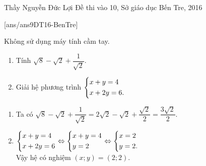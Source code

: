 \begin{name}
{Thầy  Nguyễn Đức Lợi}
{Đề thi vào 10, Sở giáo dục Bến Tre, 2016}
\end{name}
\setcounter{ex}{0}
[ans/ans9DT16-BenTre]
\begin{ex}%
    Không sử dụng máy tính cầm tay.
    \begin{enumerate}
        \item Tính $\sqrt{8}-\sqrt{2}+\dfrac{1}{\sqrt{2}}$.
        \item Giải hệ phương trình $\left\{\begin{aligned}& x+y=4\\ & x+2y=6.\end{aligned}\right.$
    \end{enumerate}
\loigiai
    {
    \begin{enumerate}
        \item Ta có $\sqrt{8}-\sqrt{2}+\dfrac{1}{\sqrt{2}}=2\sqrt{2}-\sqrt{2}+\dfrac{\sqrt{2}}{2}=\dfrac{3\sqrt{2}}{2}$.
        \item $\left\{\begin{aligned}& x+y=4\\ & x+2y=6\end{aligned}\right.\Leftrightarrow \left\{\begin{aligned}& x+y=4 \\ & y=2\end{aligned}\right.\Leftrightarrow \left\{\begin{aligned}& x=2\\ &y=2.\end{aligned}\right.$\\
        Vậy hệ có nghiệm $(x;y)=(2;2).$
    \end{enumerate}
    }
\end{ex}

